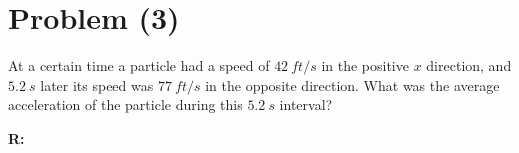 \section{Problem (3)}
	At a certain time a particle had a speed of $42 \ ft/s$ in the positive $x$ direction, and $5.2 \ s$ later its speed was $77 \ ft/s$ in the opposite direction. What was the average acceleration of the particle during this $5.2 \ s$ interval?

	\textbf{R:} \newline
